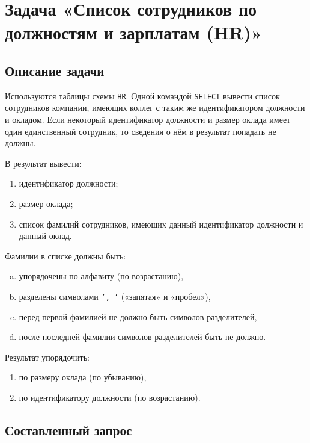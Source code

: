 \chapter{Задача «Список сотрудников по должностям и зарплатам (HR)»}


\section{Описание задачи}


Используются таблицы схемы \texttt{HR}. Одной командой \texttt{SELECT} вывести список сотрудников компании, имеющих коллег с таким же идентификатором должности и окладом. Если некоторый идентификатор должности и размер оклада имеет один единственный сотрудник, то сведения о нём в результат попадать не должны.

В результат вывести:
\begin{enumerate}[1.]%
  \item идентификатор должности;
  \item размер оклада;
  \item список фамилий сотрудников, имеющих данный идентификатор должности и данный оклад.
\end{enumerate}

Фамилии в списке должны быть:
\begin{enumerate}[a.]%
  \item упорядочены по алфавиту (по возрастанию),
  \item разделены символами \texttt{', '} («запятая» и «пробел»),
  \item перед первой фамилией не должно быть символов-разделителей,
  \item после последней фамилии символов-разделителей быть не должно.
\end{enumerate}

Результат упорядочить:
\begin{enumerate}[1.]%
  \item по размеру оклада (по убыванию),
  \item по идентификатору должности (по возрастанию).
\end{enumerate}


\section{Составленный запрос}


